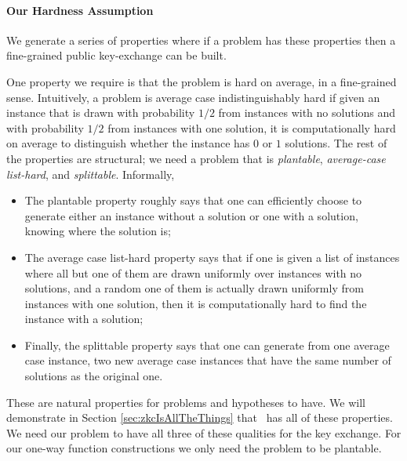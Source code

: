 \paragraph{Our Hardness Assumption}

We generate a series of properties where if a problem has these properties then a fine-grained public key-exchange can be built.

One property we require is that the problem is hard on average, in a fine-grained sense. Intuitively, a problem is average case indistinguishably hard if given an instance that is drawn with probability $1/2$ from instances with no solutions and with probability $1/2$ from instances with one solution, it is computationally hard on average to distinguish whether the instance has $0$ or $1$ solutions.
The rest of the properties are structural; we need a problem that is \emph{plantable}, \emph{average-case list-hard}, and \emph{splittable}. Informally,

\begin{itemize}
	\item The plantable property roughly says that one can efficiently choose to generate either an instance without a solution or one with a solution, knowing where the solution is; %
	\item The average case list-hard property says that if one is given a list of instances where all but one of them are drawn uniformly over instances with no solutions, and a random one of them is actually drawn uniformly from instances with one solution, then it is computationally hard to find the instance with a solution;
	\item Finally, the splittable property says that one can generate from one average case instance, two new average case instances that have the same number of solutions as the original one. %
\end{itemize}
These are natural properties for problems and hypotheses to have. We will demonstrate in Section \ref{sec:zkcIsAllTheThings} that \zkclique~has all of these properties. We need our problem to have all three of these qualities for the key exchange. For our one-way function constructions we only need the problem to be plantable.

